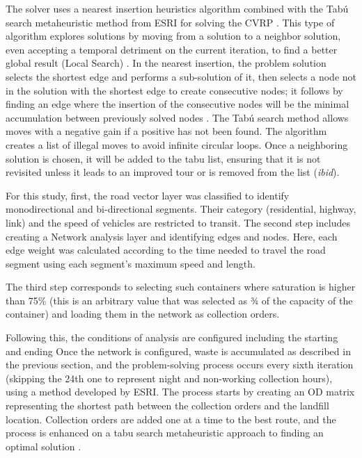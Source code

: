 \documentclass[authoryear,preprint,review,12pt]{elsarticle}
\begin{document}
    The solver uses a nearest insertion heuristics algorithm combined with the Tabú search metaheuristic method from ESRI for solving the CVRP \citep{ESRI2023a}. This type of algorithm explores solutions by moving from a solution to a neighbor solution, even accepting a temporal detriment on the current iteration, to find a better global result (Local Search) \citep{Avdoshin2019, Laporte2014}. In the nearest insertion, the problem solution selects the shortest edge and performs a sub-solution of it, then selects a node not in the solution with the shortest edge to create consecutive nodes; it follows by finding an edge where the insertion of the consecutive nodes will be the minimal accumulation between previously solved nodes \citep{Nilsson2003}. The Tabú search method allows moves with a negative gain if a positive has not been found. The algorithm creates a list of illegal moves to avoid infinite circular loops. Once a neighboring solution is chosen, it will be added to the tabu list, ensuring that it is not revisited unless it leads to an improved tour or is removed from the list (\textit{ibid}).

    For this study, first, the road vector layer was classified to identify monodirectional and bi-directional segments. Their category (residential, highway, link) and the speed of vehicles are restricted to transit. The second step includes creating a Network analysis layer and identifying edges and nodes. Here, each edge weight was calculated according to the time needed to travel the road segment using each segment's maximum speed and length.

    The third step corresponds to selecting such containers where saturation is higher than 75\% (this is an arbitrary value that was selected as ¾ of the capacity of the container) and loading them in the network as collection orders. 

    Following this, the conditions of analysis are configured including the starting and ending Once the network is configured, waste is accumulated as described in the previous section, and the problem-solving process occurs every sixth iteration (skipping the 24th one to represent night and non-working collection hours), using a method developed by ESRI. The process starts by creating an OD matrix representing the shortest path between the collection orders and the landfill location. Collection orders are added one at a time to the best route, and the process is enhanced on a tabu search metaheuristic approach to finding an optimal solution \citep{ESRI2023c}.
\end{document}
